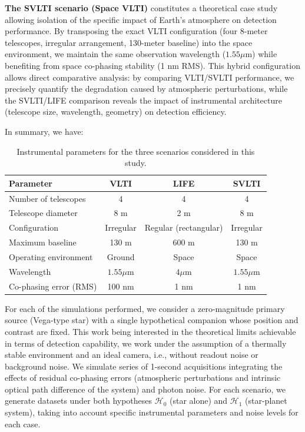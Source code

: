 \documentclass{article}
\begin{document}
\textbf{The SVLTI scenario (Space VLTI)} constitutes a theoretical case study allowing isolation of the specific impact of Earth's atmosphere on detection performance. By transposing the exact VLTI configuration (four 8-meter telescopes, irregular arrangement, 130-meter baseline) into the space environment, we maintain the same observation wavelength ($1.55\mu$m) while benefiting from space co-phasing stability (1 nm RMS). This hybrid configuration allows direct comparative analysis: by comparing VLTI/SVLTI performance, we precisely quantify the degradation caused by atmospheric perturbations, while the SVLTI/LIFE comparison reveals the impact of instrumental architecture (telescope size, wavelength, geometry) on detection efficiency.

In summary, we have:
\begin{table}[H]
\centering
\begin{tabular}{|l|c|c|c|}
\hline
\textbf{Parameter} & \textbf{VLTI} & \textbf{LIFE} & \textbf{SVLTI} \\
\hline
Number of telescopes & 4 & 4 & 4 \\
Telescope diameter & 8 m & 2 m & 8 m \\
Configuration & Irregular & Regular (rectangular) & Irregular \\
Maximum baseline & 130 m & 600 m & 130 m \\
Operating environment & Ground & Space & Space \\
Wavelength & $1.55\mu$m & $4\mu$m & $1.55\mu$m \\
Co-phasing error (RMS) & 100 nm & 1 nm & 1 nm \\
\hline
\end{tabular}
\caption{Instrumental parameters for the three scenarios considered in this study.}
\label{tab:scenarios}
\end{table}

For each of the simulations performed, we consider a zero-magnitude primary source (Vega-type star) with a single hypothetical companion whose position and contrast are fixed. This work being interested in the theoretical limits achievable in terms of detection capability, we work under the assumption of a thermally stable environment and an ideal camera, i.e., without readout noise or background noise. We simulate series of 1-second acquisitions integrating the effects of residual co-phasing errors (atmospheric perturbations and intrinsic optical path difference of the system) and photon noise. For each scenario, we generate datasets under both hypotheses $\mathcal{H}_0$ (star alone) and $\mathcal{H}_1$ (star-planet system), taking into account specific instrumental parameters and noise levels for each case.
\end{document}
